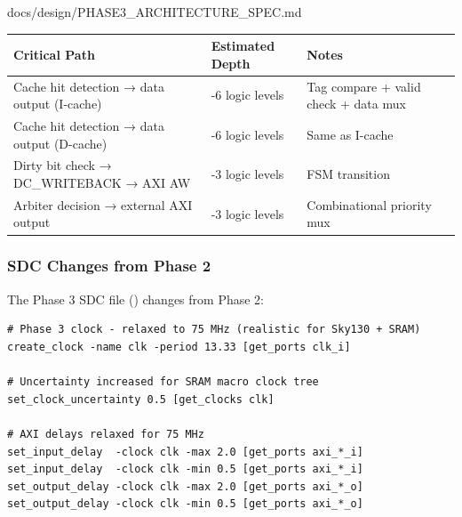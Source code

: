 \begin{relocated}{docs/design/PHASE3_ARCHITECTURE_SPEC.md}
{
\begin{longtable}[]{@{}
  >{\raggedright\arraybackslash}p{}
  >{\raggedright\arraybackslash}p{}
  >{\raggedright\arraybackslash}p{}@{}}
\toprule\noalign{}
\begin{minipage}[b]{\linewidth}\raggedright
Critical Path
\end{minipage} & \begin{minipage}[b]{\linewidth}\raggedright
Estimated Depth
\end{minipage} & \begin{minipage}[b]{\linewidth}\raggedright
Notes
\end{minipage} \\
\midrule\noalign{}
\endhead
\bottomrule\noalign{}
\endlastfoot
Cache hit detection → data output (I-cache) & 4-6 logic levels & Tag
compare + valid check + data mux \\
Cache hit detection → data output (D-cache) & 4-6 logic levels & Same as
I-cache \\
Dirty bit check → DC\_\allowbreak{}WRITEBACK → AXI AW & 2-3 logic levels
& FSM transition \\
Arbiter decision → external AXI output & 2-3 logic levels &
Combinational priority mux \\
\end{longtable}
}

\subsubsection{SDC Changes from Phase 2}\label{ds:ch:phase3-architecture:105-sdc-changes-from-phase-2}

The Phase 3 SDC file () changes
from Phase 2:

\begin{lstlisting}[language={}]
# Phase 3 clock - relaxed to 75 MHz (realistic for Sky130 + SRAM)
create_clock -name clk -period 13.33 [get_ports clk_i]

# Uncertainty increased for SRAM macro clock tree
set_clock_uncertainty 0.5 [get_clocks clk]

# AXI delays relaxed for 75 MHz
set_input_delay  -clock clk -max 2.0 [get_ports axi_*_i]
set_input_delay  -clock clk -min 0.5 [get_ports axi_*_i]
set_output_delay -clock clk -max 2.0 [get_ports axi_*_o]
set_output_delay -clock clk -min 0.5 [get_ports axi_*_o]


\end{lstlisting}
\end{relocated}
